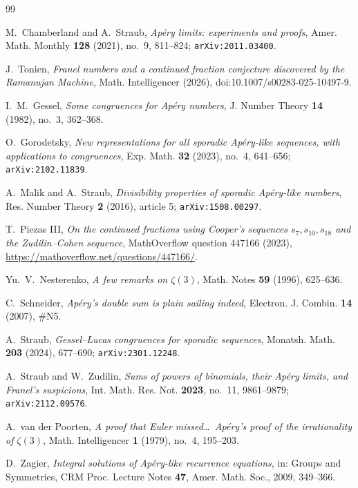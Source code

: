 \documentclass[11pt,reqno]{amsart}
\theoremstyle{definition}
\theoremstyle{remark}
\begin{document}
\begin{thebibliography}{99}

M.~Chamberland and A.~Straub,
\emph{Ap\'ery limits: experiments and proofs},
Amer. Math. Monthly \textbf{128} (2021), no.~9, 811--824;
\texttt{arXiv:2011.03400}.

J.~Tonien,
\emph{Franel numbers and a continued fraction conjecture discovered by the
Ramanujan Machine},
Math. Intelligencer (2026), doi:10.1007/s00283-025-10497-9.

I.~M.~Gessel,
\emph{Some congruences for Ap\'ery numbers},
J. Number Theory \textbf{14} (1982), no.~3, 362--368.

O.~Gorodetsky,
\emph{New representations for all sporadic Ap\'ery-like sequences, with
applications to congruences},
Exp. Math. \textbf{32} (2023), no.~4, 641--656;
\texttt{arXiv:2102.11839}.

A.~Malik and A.~Straub,
\emph{Divisibility properties of sporadic Ap\'ery-like numbers},
Res. Number Theory \textbf{2} (2016), article 5;
\texttt{arXiv:1508.00297}.

T.~Piezas III,
\emph{On the continued fractions using Cooper's sequences $s_7,s_{10},s_{18}$
and the Zudilin--Cohen sequence},
MathOverflow question 447166 (2023),
\url{https://mathoverflow.net/questions/447166/}.

Yu.~V.~Nesterenko,
\emph{A few remarks on $\zeta(3)$},
Math. Notes \textbf{59} (1996), 625--636.

C.~Schneider,
\emph{Ap\'ery's double sum is plain sailing indeed},
Electron. J. Combin. \textbf{14} (2007), \#N5.

A.~Straub,
\emph{Gessel--Lucas congruences for sporadic sequences},
Monatsh. Math. \textbf{203} (2024), 677--690;
\texttt{arXiv:2301.12248}.

A.~Straub and W.~Zudilin,
\emph{Sums of powers of binomials, their Ap\'ery limits, and Franel's
suspicions},
Int. Math. Res. Not. \textbf{2023}, no.~11, 9861--9879;
\texttt{arXiv:2112.09576}.

A.~van der Poorten,
\emph{A proof that Euler missed\dots\ Ap\'ery's proof of the irrationality of
$\zeta(3)$},
Math. Intelligencer \textbf{1} (1979), no.~4, 195--203.

D.~Zagier,
\emph{Integral solutions of Ap\'ery-like recurrence equations},
in: Groups and Symmetries, CRM Proc. Lecture Notes \textbf{47}, Amer. Math.
Soc., 2009, 349--366.

\end{thebibliography}
\end{document}
